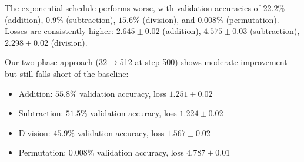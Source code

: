 \documentclass{article} %
\begin{document}
The exponential schedule performs worse, with validation accuracies of $22.2\%$ (addition), $0.9\%$ (subtraction), $15.6\%$ (division), and $0.008\%$ (permutation). Losses are consistently higher: $2.645 \pm 0.02$ (addition), $4.575 \pm 0.03$ (subtraction), $2.298 \pm 0.02$ (division).

Our two-phase approach (32$\to$512 at step 500) shows moderate improvement but still falls short of the baseline:
\begin{itemize}
    \item Addition: $55.8\%$ validation accuracy, loss $1.251 \pm 0.02$
    \item Subtraction: $51.5\%$ validation accuracy, loss $1.224 \pm 0.02$
    \item Division: $45.9\%$ validation accuracy, loss $1.567 \pm 0.02$
    \item Permutation: $0.008\%$ validation accuracy, loss $4.787 \pm 0.01$
\end{itemize}
\end{document}
